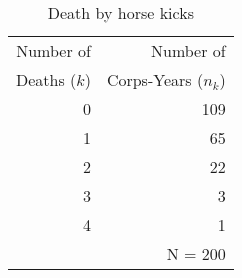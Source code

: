 \begin{table}[htb]
\caption{Death by horse kicks}
\label{tab:horskick}
 \begin{center}
  \begin{tabular}{rr}
  \hline
Number of   & Number of  \\
Deaths ($k$)& Corps-Years ($n_k$)\\
  \hline
0 & 109 \\
1 & 65 \\
2 & 22 \\
3 & 3 \\
4 & 1 \\
  & N = 200 \\
  \hline
  \end{tabular}
 \end{center}
\end{table}
